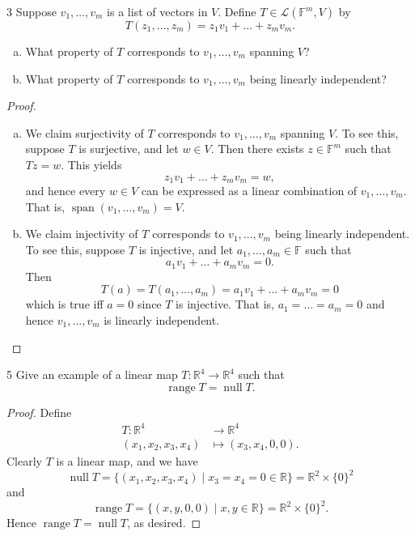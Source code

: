 \documentclass{extarticle}
\newenvironment{problem}[1]{\begin{prob*}{#1}{}}{\end{prob*}}
\newcommand{\R}{\mathbb{R}}
\newcommand{\F}{\mathbb{F}}
\DeclareMathOperator{\Span}{span}
\newcommand{\Hom}{\mathcal{L}}
\DeclareMathOperator{\Null}{null}
\DeclareMathOperator{\Range}{range}
\begin{document}
\begin{problem}{3}
Suppose $v_1,\dots,v_m$ is a list of vectors in $V$.  Define $T\in\Hom(\F^m, V)$ by
\begin{equation*}
T(z_1,\dots, z_m) = z_1v_1 + \dots + z_m v_m.
\end{equation*}
\begin{enumerate}[(a)]
\item What property of $T$ corresponds to $v_1,\dots, v_m$ spanning $V$?
\item What property of $T$ corresponds to $v_1,\dots, v_m$ being linearly independent?
\end{enumerate}
\end{problem}
\begin{proof}
\begin{enumerate}[(a)]
\item We claim surjectivity of $T$ corresponds to $v_1,\dots, v_m$ spanning $V$.  To see this, suppose $T$ is surjective, and let $w\in V$.  Then there exists $z\in \F^m$ such that $Tz = w$.  This yields 
\begin{equation*}
z_1v_1 + \dots + z_m v_m = w,
\end{equation*}
and hence every $w\in V$ can be expressed as a linear combination of $v_1,\dots, v_m$.  That is, $\Span(v_1,\dots,v_m)= V$.
\item We claim injectivity of $T$ corresponds to $v_1,\dots, v_m$ being linearly independent.  To see this, suppose $T$ is injective, and let $a_1,\dots, a_m\in\F$ such that 
\begin{equation*}
a_1v_1 + \dots + a_mv_m = 0.
\end{equation*}
Then 
\begin{equation*}
T(a) = T(a_1,\dots, a_m) = a_1v_1 + \dots + a_mv_m = 0
\end{equation*}
which is true iff $a = 0$ since $T$ is injective.  That is, $a_1=\dots = a_m=0$ and hence $v_1,\dots, v_m$ is linearly independent. \qedhere
\end{enumerate}
\end{proof}

\begin{problem}{5}
Give an example of a linear map $T:\R^4\to\R^4$ such that 
\begin{equation*}
\Range T = \Null T.
\end{equation*}
\end{problem}
\begin{proof}
Define
\begin{align*}
T: \R^4 &\to \R^4\\
(x_1,x_2,x_3,x_4) &\mapsto (x_3, x_4, 0, 0).
\end{align*}
Clearly $T$ is a linear map, and we have
\begin{equation*}
\Null T =\{(x_1, x_2, x_3, x_4)\mid x_3 = x_4 = 0\in\R\} = \R^2\times \{0\}^2
\end{equation*}
and 
\begin{equation*}
\Range T = \{(x, y, 0, 0)\mid x, y\in\R\} = \R^2 \times \{0\}^2.
\end{equation*}
Hence $\Range T = \Null T$, as desired.
\end{proof}
\end{document}
